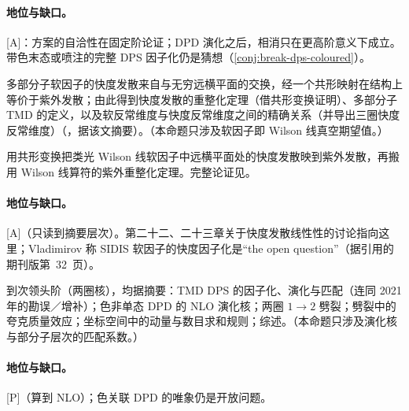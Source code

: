 \paragraph{地位与缺口。}[A]：方案的自洽性在固定阶论证；DPD 演化之后，相消只在更高阶意义下成立。带色末态或喷注的完整 DPS 因子化仍是猜想（\cref{conj:break-dps-coloured}）。

\begin{proposition}\label{prop:front-rapidity-renorm}
多部分子软因子的快度发散来自与无穷远横平面的交换，经一个共形映射在结构上等价于紫外发散；由此得到快度发散的重整化定理（借共形变换证明）、多部分子 TMD 的定义，以及软反常维度与快度反常维度之间的精确关系（并导出三圈快度反常维度）（\cite{Vladimirov:2017ksc}，据该文摘要）。（本命题只涉及软因子即 Wilson 线真空期望值。）
\end{proposition}

\begin{proofsketch}
用共形变换把类光 Wilson 线软因子中远横平面处的快度发散映到紫外发散，再搬用 Wilson 线算符的紫外重整化定理。完整论证见\cite{Vladimirov:2017ksc}。
\end{proofsketch}

\paragraph{地位与缺口。}[A]（只读到摘要层次）。第二十二、二十三章关于快度发散线性性的讨论指向这里；Vladimirov 称 SIDIS 软因子的快度因子化是“the open question”（据\cite{Liu:2023pjb}引用的\cite{Vladimirov:2017ksc}期刊版第~32~页）。

\begin{proposition}\label{prop:front-dpd-evolution}
到次领头阶（两圈核），均据摘要：TMD DPS 的因子化、演化与匹配\cite{Buffing:2017mqm}（连同 2021 年的勘误／增补）；色非单态 DPD 的 NLO 演化核\cite{Diehl:2022rxb}；两圈 $1\to2$ 劈裂\cite{Diehl:2019rdh}；劈裂中的夸克质量效应\cite{Diehl:2022dia}；坐标空间中的动量与数目求和规则\cite{Diehl:2020xyg}；综述\cite{Diehl:2017wew}。（本命题只涉及演化核与部分子层次的匹配系数。）
\end{proposition}

\paragraph{地位与缺口。}[P]（算到 NLO）；色关联 DPD 的唯象仍是开放问题。
